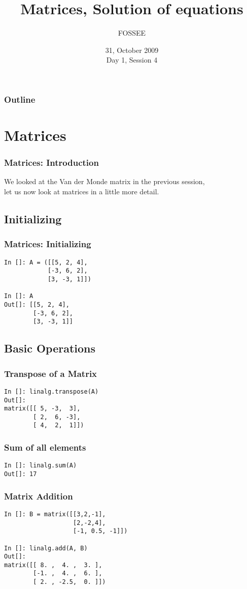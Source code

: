 \documentclass[14pt,compress]{beamer}
\title[Basic Python]{Matrices, Solution of equations}
\author[FOSSEE] {FOSSEE}
\institute[IIT Bombay] {Department of Aerospace Engineering\\IIT Bombay}
\date[] {31, October 2009\\Day 1, Session 4}
\begin{document}
\begin{frame}
  \titlepage
\end{frame}

\begin{frame}
  \frametitle{Outline}
  \tableofcontents
\end{frame}

\section{Matrices}

\begin{frame}
\frametitle{Matrices: Introduction}
We looked at the Van der Monde matrix in the previous session,\\ 
let us now look at matrices in a little more detail.
\end{frame}

\subsection{Initializing}
\begin{frame}[fragile]
\frametitle{Matrices: Initializing}
\begin{lstlisting}
In []: A = ([[5, 2, 4], 
            [-3, 6, 2], 
            [3, -3, 1]])

In []: A
Out[]: [[5, 2, 4], 
        [-3, 6, 2], 
        [3, -3, 1]]
\end{lstlisting}
\end{frame}

\subsection{Basic Operations}

\begin{frame}[fragile]
\frametitle{Transpose of a Matrix}
\begin{lstlisting}
In []: linalg.transpose(A)
Out[]: 
matrix([[ 5, -3,  3],
        [ 2,  6, -3],
        [ 4,  2,  1]])
\end{lstlisting}
\end{frame}

\begin{frame}[fragile]
  \frametitle{Sum of all elements}
  \begin{lstlisting}
In []: linalg.sum(A)
Out[]: 17
  \end{lstlisting}
\end{frame}

\begin{frame}[fragile]
  \frametitle{Matrix Addition}
  \begin{lstlisting}
In []: B = matrix([[3,2,-1],
                   [2,-2,4],
                   [-1, 0.5, -1]])

In []: linalg.add(A, B)
Out[]: 
matrix([[ 8. ,  4. ,  3. ],
        [-1. ,  4. ,  6. ],
        [ 2. , -2.5,  0. ]])
  \end{lstlisting}
\end{frame}
\end{document}
